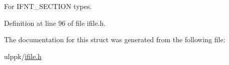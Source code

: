 For I\-F\-N\-T\-\_\-\-S\-E\-C\-T\-I\-O\-N types. 



Definition at line 96 of file ifile.\-h.



The documentation for this struct was generated from the following file\-:\begin{DoxyCompactItemize}
\item 
ulppk/\hyperlink{ifile_8h}{ifile.\-h}\end{DoxyCompactItemize}
